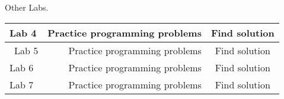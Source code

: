 \documentclass[12pt]{article}
\begin{document}
                           \begin{center}
                            \begin{large} 
                            Other Labs.\\

\begin{tabular}{|l|r|c|} \hline
 Lab 4& Practice programming problems & Find solution \\ \hline\
  Lab 5& Practice programming problems & Find solution \\ \hline 
  Lab 6& Practice programming problems & Find solution \\ \hline 
  Lab 7& Practice programming problems & Find solution \\ \hline

\end{tabular} 
\end{large}

 \end{center}
  
\end{document}
